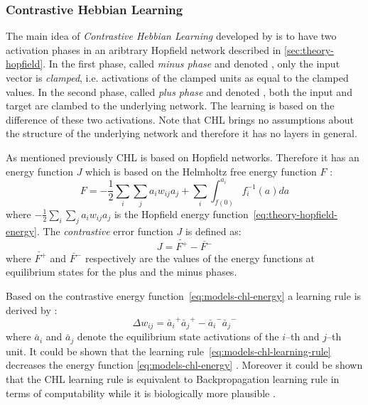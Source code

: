 
\subsubsection{Contrastive Hebbian Learning}
\label{sec:models-chl} 

The main idea of \emph{Contrastive Hebbian Learning} developed by \citet{movellan1990contrastive} is to have two activation phases in an aribtrary Hopfield network \citep{hopfield1984neurons} described in \ref{sec:theory-hopfield}. In the first phase, called \emph{minus phase} and denoted \quotes{-}, only the input vector is \emph{clamped}, i.e. activations of the clamped units as equal to the clamped values. In the second phase, called \emph{plus phase} and denoted \quotes{+}, both the input and target are clambed to the underlying network. The learning is based on the difference of these two activations. Note that CHL brings no assumptions about the structure of the underlying network and therefore it has no layers in general. 

As mentioned previously CHL is based on Hopfield networks. Therefore it has an energy function $J$ which is based on the Helmholtz free energy function $F$ \citep{hinton1989deterministic}:
\begin{equation}
  \label{eq:models-chl-helmholtz}
  F = -\frac{1}{2}\sum_i\sum_ja_iw_{ij}a_j + \sum_i \int_{f(0)}^{a_i} f_i^{-1}(a)da
\end{equation} 
where $-\frac{1}{2}\sum_i\sum_ja_iw_{ij}a_j$ is the Hopfield energy function~\ref{eq:theory-hopfield-energy}. The \emph{contrastive} error function $J$ is defined as: 
\begin{equation}
  \label{eq:models-chl-energy}
  J = \breve{F^{+}} - \breve{F^{-}}
\end{equation} 
where $\breve{F^{+}}$ and $\breve{F^{-}}$ respectively are the values of the energy functions at equilibrium states for the plus and the minus phases. 

Based on the contrastive energy function~\ref{eq:models-chl-energy} a learning rule is derived by \citet{movellan1990contrastive}: 
\begin{equation}
  \label{eq:models-chl-learning-rule}
  \Delta w_{ij} = \breve{a_i}^{+}\breve{a_j}^{+} - \breve{a_i}^{-}\breve{a_j}^{-}
\end{equation}
where $\breve{a_i}$ and $\breve{a_j}$ denote the equilibrium state activations of the $i$--th and $j$--th unit. It could be shown that the learning rule~\ref{eq:models-chl-learning-rule} decreases the energy function \ref{eq:models-chl-energy} \citep{movellan1990contrastive}. Moreover it could be shown that the CHL learning rule is equivalent to Backpropagation learning rule in terms of computability while it is biologically more plausible \citep{o1996bio, xie2003equivalence}. 

   
